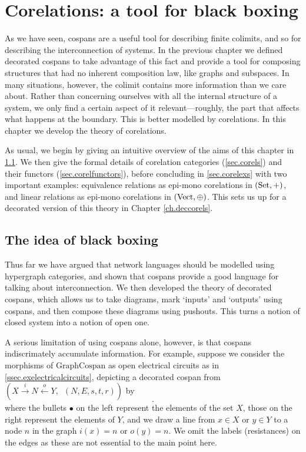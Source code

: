 \chapter{Corelations: a tool for black boxing} \label{ch.corelations}

As we have seen, cospans are a useful tool for describing finite colimits, and
so for describing the interconnection of systems. In the previous chapter
we defined decorated cospans to take advantage of this fact and provide
a tool for composing structures that had no inherent composition law, like
graphs and subspaces. In many situations, however, the colimit contains more
information than we care about. Rather than concerning ourselves with all the
internal structure of a system, we only find a certain aspect of it
relevant---roughly, the part that affects what happens at the boundary. This is
better modelled by corelations. In this chapter we develop the theory of
corelations.

As usual, we begin by giving an intuitive overview of the aims of this chapter
in \textsection\ref{sec.blackboxing}. We then give the formal details of
corelation categories (\textsection\ref{sec.corels}) and their functors
(\textsection\ref{sec.corelfunctors}), before concluding in
\textsection\ref{sec.corelexs} with two important
examples: equivalence relations as epi-mono corelations in $(\mathrm{Set},+)$, and
linear relations as epi-mono corelations in $(\mathrm{Vect},\oplus)$. This sets us up
for a decorated version of this theory in Chapter \ref{ch.deccorels}.

\section{The idea of black boxing} \label{sec.blackboxing}

Thus far we have argued that network languages should be modelled using
hypergraph categories, and shown that cospans provide a good language for
talking about interconnection. We then developed the theory of decorated
cospans, which allows us to take diagrams, mark `inputs' and `outputs' using
cospans, and then compose these diagrams using pushouts. This turns a notion of
closed system into a notion of open one.

A serious limitation of using cospans alone, however, is that cospans
indiscrimately accumulate information. For example, suppose we consider the
morphisms of $\mathrm{GraphCospan}$ as open electrical circuits as in
\textsection\ref{ssec.exelectricalcircuits}, depicting a decorated cospan from
$(X \xrightarrow{i} N \xleftarrow{o} Y, \enspace (N,E,s,t,r))$ by 
\[
  .
\]
where the bullets $\bullet$ on the left represent the elements of the set $X$,
those on the right represent the elements of $Y$, and we draw a line from $x \in
X$ or $y \in Y$ to a node $n$ in the graph $i(x) = n$ or $o(y)=n$.
We omit the labels (resistances) on the edges as these are not essential to the
main point here.  

